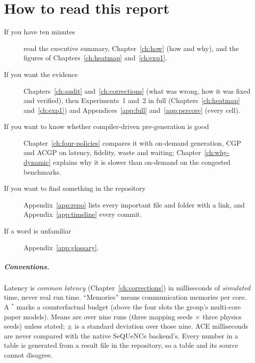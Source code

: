 \chapter*{How to read this report}

\begin{description}
  \item[If you have ten minutes] read the executive summary, Chapter~\ref{ch:how} (how and why), and the figures of Chapters~\ref{ch:heatmap} and~\ref{ch:exp1}.
  \item[If you want the evidence] Chapters~\ref{ch:audit} and~\ref{ch:corrections} (what was wrong, how it was fixed and verified), then Experiments~1 and~2 in full
        (Chapters~\ref{ch:heatmap} and~\ref{ch:exp1}) and Appendices~\ref{app:full} and~\ref{app:percore} (every cell).
  \item[If you want to know whether compiler-driven pre-generation is good] Chapter~\ref{ch:four-policies} compares it with on-demand generation, CGP and ACGP on latency, fidelity, waste and waiting; Chapter~\ref{ch:why-dynamic} explains why it is slower than on-demand on the congested benchmarks.
  \item[If you want to find something in the repository] Appendix~\ref{app:repo} lists every important file and folder with a link, and Appendix~\ref{app:timeline} every commit.
  \item[If a word is unfamiliar] Appendix~\ref{app:glossary}.
\end{description}

\paragraph{Conventions.} Latency is \emph{common latency} (Chapter~\ref{ch:corrections}) in milliseconds of \emph{simulated} time, never real run time. ``Memories'' means communication memories per core. A $^*$ marks a counterfactual budget
(above the four slots the group's multi-core paper models). Means are over nine runs (three mapping seeds $\times$ three physics seeds) unless stated; $\pm$ is a standard deviation over those nine. ACE milliseconds are never compared with the
native SeQUeNCe backend's. Every number in a table is generated from a result file in the repository, so a table and its source cannot disagree.
